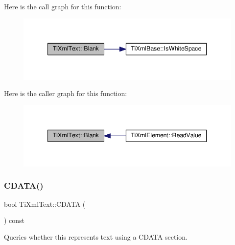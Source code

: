 Here is the call graph for this function\+:\nopagebreak
\begin{figure}[H]
\begin{center}
\leavevmode
\includegraphics[width=340pt]{class_ti_xml_text_a0fd9005b279def46859b72f336b158da_cgraph}
\end{center}
\end{figure}
Here is the caller graph for this function\+:\nopagebreak
\begin{figure}[H]
\begin{center}
\leavevmode
\includegraphics[width=340pt]{class_ti_xml_text_a0fd9005b279def46859b72f336b158da_icgraph}
\end{center}
\end{figure}
\mbox{\label{class_ti_xml_text_aac1f4764d220ed6bf809b16dfcb6b45a}} 
\subsubsection{\texorpdfstring{C\+D\+A\+T\+A()}{CDATA()}}
{\footnotesize\ttfamily bool Ti\+Xml\+Text\+::\+C\+D\+A\+TA (\begin{DoxyParamCaption}{ }\end{DoxyParamCaption}) const\hspace{0.3cm}{\ttfamily [inline]}}



Queries whether this represents text using a C\+D\+A\+TA section. 

